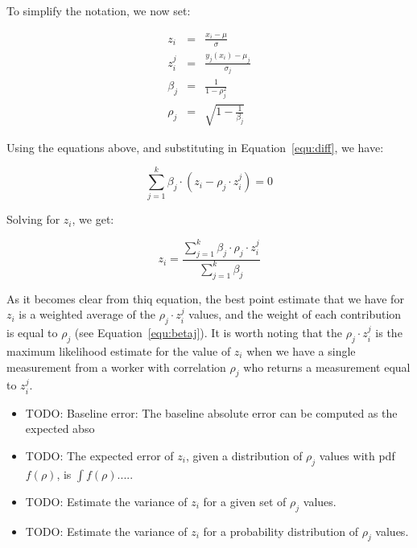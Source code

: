 \documentclass{article}
\begin{document}
To simplify the notation, we now set:

\begin{eqnarray}
z_i	& = & \frac{x_i - \mu}{\sigma} \label{equ:zi} \\
z_i^j	& = & \frac{y_j(x_i) - \mu_j}{\sigma_j} \label{equ:zij} \\
\beta_j & = & \frac{1}{1-\rho_j^2} \label{equ:betaj} \\
\rho_j  & = & \sqrt{1-\frac{1}{\beta_j}} \label{equ:rhoj}
\end{eqnarray}

\noindent Using the equations above, and substituting in Equation~\ref{equ:diff}, we have:

\begin{displaymath}
\sum_{j=1}^k \beta_j \cdot \left( z_i - \rho_j \cdot z_i^j \right) = 0
\end{displaymath}



\noindent Solving for $z_i$, we get:

\begin{equation}
\label{equ:z-aggregate}
z_i = \frac{ \sum_{j=1}^k \beta_j \cdot \rho_j \cdot z_i^j } {\sum_{j=1}^k \beta_j } 
\end{equation}

\noindent As it becomes clear from thiq equation, the best point estimate that we have for $z_i$ is a weighted average of the $\rho_j \cdot z_i^j$ values, and the weight of each contribution is equal to $\rho_j$ (see Equation~\ref{equ:betaj}). It is worth noting that the $\rho_j \cdot z_i^j$ is the maximum likelihood estimate for the value of $z_i$ when we have a single measurement from a worker with correlation $\rho_j$ who returns a measurement equal to $z_i^j$.

\begin{itemize}
\item TODO: Baseline error: The baseline absolute error can be computed as the expected abso

\item TODO: The expected error of $z_i$, given a distribution of $\rho_j$ values with pdf $f(\rho)$, is $\int f(\rho) ....$.

\item TODO: Estimate the variance of $z_i$ for a given set of $\rho_j$ values.

\item TODO: Estimate the variance of $z_i$ for a probability distribution of $\rho_j$ values.

\end{itemize}
\end{document}

